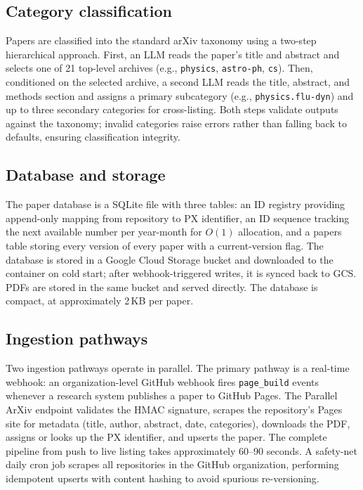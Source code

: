 \documentclass[11pt]{article}
\begin{document}
\subsection{Category classification}

Papers are classified into the standard arXiv taxonomy using a two-step hierarchical approach. First, an LLM reads the paper's title and abstract and selects one of 21 top-level archives (e.g., \texttt{physics}, \texttt{astro-ph}, \texttt{cs}). Then, conditioned on the selected archive, a second LLM reads the title, abstract, and methods section and assigns a primary subcategory (e.g., \texttt{physics.flu-dyn}) and up to three secondary categories for cross-listing. Both steps validate outputs against the taxonomy; invalid categories raise errors rather than falling back to defaults, ensuring classification integrity.

\subsection{Database and storage}

The paper database is a SQLite file with three tables: an ID registry providing append-only mapping from repository to PX identifier, an ID sequence tracking the next available number per year-month for $O(1)$ allocation, and a papers table storing every version of every paper with a current-version flag. The database is stored in a Google Cloud Storage bucket and downloaded to the container on cold start; after webhook-triggered writes, it is synced back to GCS. PDFs are stored in the same bucket and served directly. The database is compact, at approximately 2\,KB per paper.

\subsection{Ingestion pathways}

Two ingestion pathways operate in parallel. The primary pathway is a real-time webhook: an organization-level GitHub webhook fires \texttt{page\_build} events whenever a research system publishes a paper to GitHub Pages. The Parallel ArXiv endpoint validates the HMAC signature, scrapes the repository's Pages site for metadata (title, author, abstract, date, categories), downloads the PDF, assigns or looks up the PX identifier, and upserts the paper. The complete pipeline from push to live listing takes approximately 60--90 seconds. A safety-net daily cron job scrapes all repositories in the GitHub organization, performing idempotent upserts with content hashing to avoid spurious re-versioning.
\end{document}
